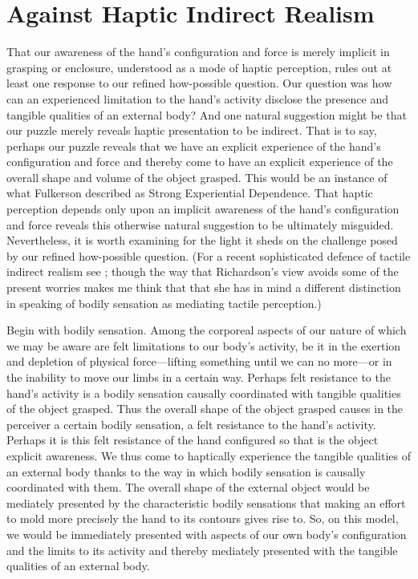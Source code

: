 
\section{Against Haptic Indirect Realism} %
\label{sec:against_haptic_indirect_realism}

That our awareness of the hand's configuration and force is merely implicit in grasping or enclosure, understood as a mode of haptic perception, rules out at least one response to our refined how-possible question. Our question was how can an experienced limitation to the hand's activity disclose the presence and tangible qualities of an external body? And one natural suggestion might be that our puzzle merely reveals haptic presentation to be indirect. That is to say, perhaps our puzzle reveals that we have an explicit experience of the hand's configuration and force and thereby come to have an explicit experience of the overall shape and volume of the object grasped. This would be an instance of what Fulkerson described as Strong Experiential Dependence. That haptic perception depends only upon an implicit awareness of the hand's configuration and force reveals this otherwise natural suggestion to be ultimately misguided. Nevertheless, it is worth examining for the light it sheds on the challenge posed by our refined how-possible question. (For a recent sophisticated defence of tactile indirect realism see \citealt{Richardson:2013aa}; though the way that Richardson's view avoids some of the present worries makes me think that that she has in mind a different distinction in speaking of bodily sensation as mediating tactile perception.)

Begin with bodily sensation. Among the corporeal aspects of our nature of which we may be aware are felt limitations to our body's activity, be it in the exertion and depletion of physical force---lifting something until we can no more---or in the inability to move our limbs in a certain way. Perhaps felt resistance to the hand's activity is a bodily sensation causally coordinated with tangible qualities of the object grasped. Thus the overall shape of the object grasped causes in the perceiver a certain bodily sensation, a felt resistance to the hand's activity. Perhaps it is this felt resistance of the hand configured so that is the object explicit awareness. We thus come to haptically experience the tangible qualities of an external body thanks to the way in which bodily sensation is causally coordinated with them. The overall shape of the external object would be mediately presented by the characteristic bodily sensations that making an effort to mold more precisely the hand to its contours gives rise to. So, on this model, we would be immediately presented with aspects of our own body's configuration and the limits to its activity and thereby mediately presented with the tangible qualities of an external body.

